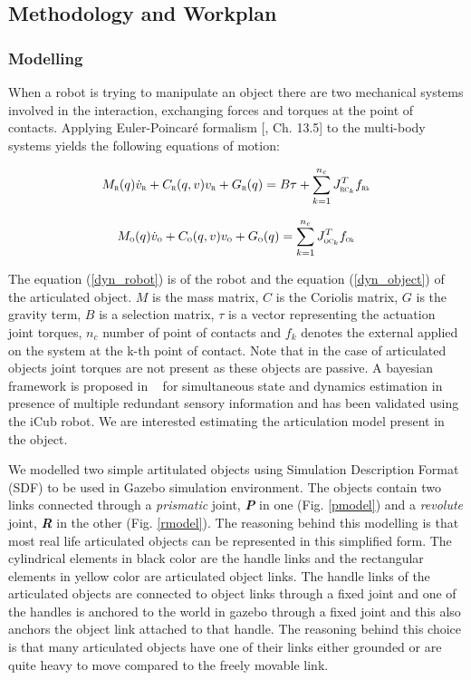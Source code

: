 \documentclass[12pt,a4paper]{report}
\begin{document}
\subsection{Methodology and Workplan}
\subsubsection{Modelling}
When a robot is trying to manipulate an object there are two mechanical systems involved in the interaction, exchanging forces and torques at the point of contacts. Applying Euler-Poincar\'e formalism [\cite{marsden2013introduction}, Ch. 13.5] to the multi-body systems yields the following equations of motion:

\begin{equation}
	M_{\scalebox{.5}R}(q)\dot{v}_{\scalebox{.5}R} + C_{\scalebox{.5}R}(q,v)v_{\scalebox{.5}R} + G_{\scalebox{.5}R}(q) = B\tau + \sum_{k=1}^{n_c} J_{{\scalebox{.5}{RC}}_k}^T f_{\scalebox{.5}{Rk}}
	\label{dyn_robot}
\end{equation}

\begin{equation}
	M_{\scalebox{.5}O}(q)\dot{v}_{\scalebox{.5}O} + C_{\scalebox{.5}O}(q,v)v_{\scalebox{.5}O} + G_{\scalebox{.5}O}(q) = \sum_{k=1}^{n_c} J_{{\scalebox{.5}{OC}}_k}^T f_{\scalebox{.5}{Ok}}
	\label{dyn_object}
\end{equation}

The equation (\ref{dyn_robot}) is of the robot and the equation (\ref{dyn_object}) of the articulated object. $M$ is the mass matrix, $C$ is the Coriolis matrix, $G$ is the gravity term, $B$ is a selection matrix, $\tau$ is a vector representing the actuation joint torques, $n_c$ number of point of contacts and $f_k$ denotes the external applied on the system at the k-th point of contact. Note that in the case of articulated objects joint torques are not present as these objects are passive. A bayesian framework is proposed in ~\cite{nori2015simultaneous} for simultaneous state and dynamics estimation in presence of multiple redundant sensory information and has been validated using the iCub robot. We are interested estimating the articulation model present in the object.


We modelled two simple artitulated objects using Simulation Description Format (SDF) to be used in Gazebo simulation environment. The objects contain two links connected through a \textit{prismatic} joint, \textit{\textbf{P}} in one (Fig. \ref{pmodel}) and a \textit{revolute} joint, \textit{\textbf{R}} in the other  (Fig. \ref{rmodel}). The reasoning behind this modelling is that most real life articulated objects can be represented in this simplified form. The cylindrical elements in black color are the handle links and the rectangular elements in yellow color are articulated object links. The handle links of the articulated objects are connected to object links through a fixed joint and one of the handles is anchored to the world in gazebo through a fixed joint and this also anchors the object link attached to that handle. The reasoning behind this choice is that many articulated objects have one of their links either grounded or are quite heavy to move compared to the freely movable link. 
\end{document}
